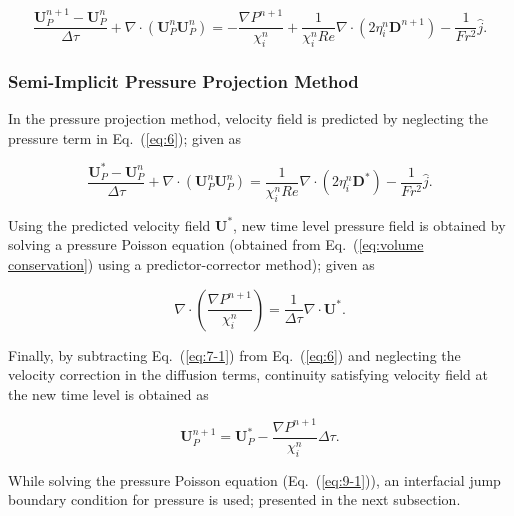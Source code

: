 \documentclass[preprint,12pt]{elsarticle}
\begin{document}
\begin{equation}
\frac{\mathbf{U}_{P}^{n+1}-\mathbf{U}_{P}^{n}}{\Delta\tau}+\nabla\cdot(\mathbf{U}_{P}^{n}\mathbf{U}_{P}^{n})=-\frac{\nabla P^{n+1}}{\chi_{i}^{n}}+\frac{1}{\chi_{i}^{n}Re}\nabla\cdot(2\eta_{i}^{n}\mathbf{D}^{n+1})-\frac{1}{Fr^{2}}\hat{j}.\label{eq:6}
\end{equation}



\subsubsection{Semi-Implicit Pressure Projection Method}

In the pressure projection method,  velocity field  is predicted by
neglecting the pressure term in Eq.~(\ref{eq:6}); given as

\begin{equation}
\frac{\mathbf{U}_{P}^{*}-\mathbf{U}_{P}^{n}}{\Delta\tau}+\nabla\cdot(\mathbf{U}_{P}^{n}\mathbf{U}_{P}^{n})=\frac{1}{\chi_{i}^{n}Re}\nabla\cdot(2\eta_{i}^{n}\mathbf{D}^{*})-\frac{1}{Fr^{2}}\hat{j}.\label{eq:7-1}
\end{equation}


\noindent Using the predicted velocity field $\mathbf{U^{*}}$, new
time level pressure field is obtained by solving a pressure Poisson
equation (obtained from Eq.~(\ref{eq:volume conservation}) using
a predictor-corrector method); given as

\begin{equation}
\nabla\cdot\left(\frac{\nabla P^{n+1}}{\chi_{i}^{n}}\right)=\frac{1}{\Delta\tau}\nabla\cdot\mathbf{U^{*}}.\label{eq:9-1}
\end{equation}


\noindent Finally, by subtracting Eq.~(\ref{eq:7-1}) from Eq.~(\ref{eq:6})
and neglecting the velocity correction in the diffusion terms, continuity
satisfying velocity field at the new time level is obtained as







\begin{equation}
\mathbf{U}_{P}^{n+1}=\mathbf{U}_{P}^{*}-\frac{\nabla P^{n+1}}{\chi_{i}^{n}}\Delta\tau.\label{eq:8}
\end{equation}


\noindent While solving the pressure Poisson equation (Eq.~(\ref{eq:9-1})),
an interfacial jump boundary condition for pressure is used; presented
in the next subsection.
\end{document}
